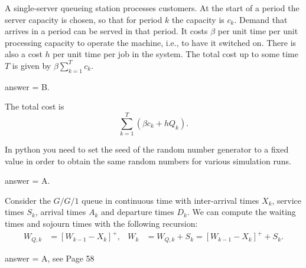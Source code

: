 \begin{exercise}[201903]
  A single-server queueing station processes customers.
  At the start of a period the server capacity is chosen, so that for period $k$ the capacity is $c_k$.
  Demand that arrives in a period can be served in that period.
  It costs $\beta$ per unit time per unit processing capacity to operate the machine, i.e., to have it switched on.
  There is also a cost $h$ per unit time per job in the system.
  The total cost up to some time $T$ is given by  $\beta \sum_{k=1}^T c_k$.
\begin{solution}
answer = B.

The total cost is
    \begin{equation*}
      \sum_{k=1}^T \left(\beta c_k + h Q_k\right).
    \end{equation*}

  \end{solution}
\end{exercise}

\begin{exercise}[201903]
In python you need to set the seed of the random number generator to a fixed value in order to obtain the same random numbers for various simulation runs. 
\begin{solution}
answer = A.
\end{solution}
\end{exercise}

\begin{exercise}[201903]
Consider the $G/G/1$ queue in continuous time with inter-arrival times $X_k$, service times $S_k$, arrival times $A_k$ and departure times $D_k$. We can compute the waiting times and sojourn times with the following recursion:
\begin{align}
  W_{Q,k} &= [W_{k-1} - X_k]^+, &
  W_{k} &= W_{Q,k} + S_k = [W_{k-1} - X_k]^+ + S_k.
\end{align}

\begin{solution}
answer = A, see Page 58
\end{solution}
\end{exercise}



